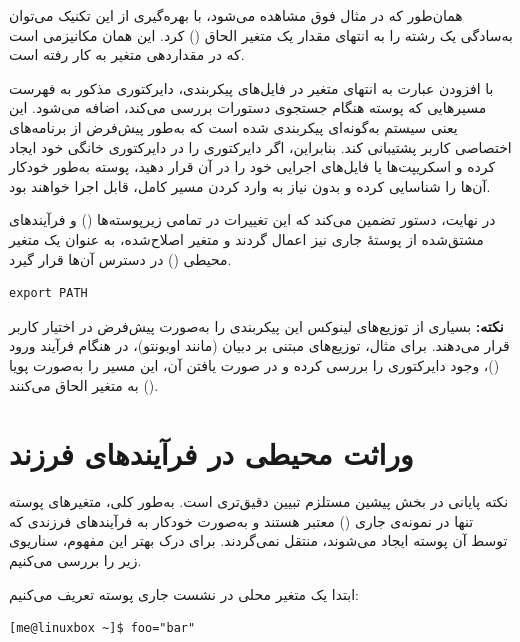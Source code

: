 همان‌طور که در مثال فوق مشاهده می‌شود، با بهره‌گیری از این تکنیک می‌توان به‌سادگی یک رشته را به انتهای مقدار یک متغیر الحاق () کرد. این همان مکانیزمی است که در مقداردهی متغیر  به کار رفته است.

با افزودن عبارت  به انتهای متغیر  در فایل‌های پیکربندی، دایرکتوری مذکور به فهرست مسیرهایی که پوسته هنگام جستجوی دستورات بررسی می‌کند، اضافه می‌شود. این یعنی سیستم به‌گونه‌ای پیکربندی شده است که به‌طور پیش‌فرض از برنامه‌های اختصاصی کاربر پشتیبانی کند. بنابراین، اگر دایرکتوری  را در دایرکتوری خانگی خود ایجاد کرده و اسکریپت‌ها یا فایل‌های اجرایی خود را در آن قرار دهید، پوسته به‌طور خودکار آن‌ها را شناسایی کرده و بدون نیاز به وارد کردن مسیر کامل، قابل اجرا خواهند بود.

در نهایت، دستور  تضمین می‌کند که این تغییرات در تمامی زیرپوسته‌ها () و فرآیندهای مشتق‌شده از پوستهٔ جاری نیز اعمال گردند و متغیر  اصلاح‌شده، به عنوان یک متغیر محیطی () در دسترس آن‌ها قرار گیرد.

\begin{latin}
\begin{lstlisting}
export PATH
\end{lstlisting}
\end{latin}

\begin{note}
\textbf{نکته:} بسیاری از توزیع‌های لینوکس این پیکربندی را به‌صورت پیش‌فرض در اختیار کاربر قرار می‌دهند. برای مثال، توزیع‌های مبتنی بر دبیان (مانند اوبونتو)، در هنگام فرآیند ورود ()، وجود دایرکتوری  را بررسی کرده و در صورت یافتن آن، این مسیر را به‌صورت پویا () به متغیر  الحاق می‌کنند.
\end{note}

\section{وراثت محیطی در فرآیندهای فرزند}

نکته پایانی در بخش پیشین مستلزم تبیین دقیق‌تری است. به‌طور کلی، متغیرهای پوسته تنها در نمونه‌ی جاری () معتبر هستند و به‌صورت خودکار به فرآیندهای فرزندی که توسط آن پوسته ایجاد می‌شوند، منتقل نمی‌گردند. برای درک بهتر این مفهوم، سناریوی زیر را بررسی می‌کنیم.

ابتدا یک متغیر محلی در نشست جاری پوسته تعریف می‌کنیم:

\begin{latin}
\begin{lstlisting}
[me@linuxbox ~]$ foo="bar"
\end{lstlisting}
\end{latin}

